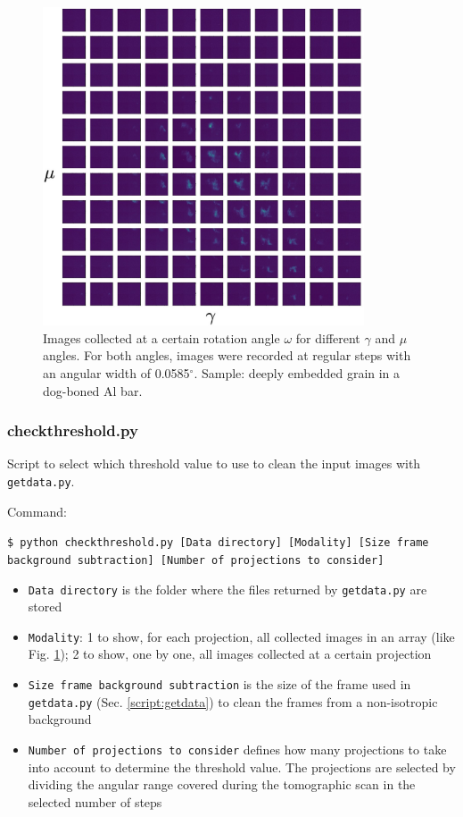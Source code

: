 \documentclass[11pt]{scrartcl}
\begin{document}
\begin{figure}[h!]
    \centering
    \includegraphics[width=0.85\textwidth]{Img_one_proj}
    \caption{Images collected at a certain rotation angle $\omega$ for different $\gamma$ and $\mu$ angles. For both angles, images were recorded at regular steps with an angular width of 0.0585$^{\circ}$. Sample: deeply embedded grain in a dog-boned Al bar.}
    \label{fig:all_pics_one_om}
\end{figure}

\subsubsection{check\textunderscore threshold.py}

Script to select which threshold value to use to clean the input images with {\texttt{getdata.py}}.

Command:

{\texttt{\$ python check\textunderscore threshold.py [Data directory] [Modality] [Size frame background subtraction] [Number of projections to consider]}}

\begin{itemize}
    \item {\texttt{Data directory}} is the folder where the files returned by {\texttt{getdata.py}} are stored
    \item {\texttt{Modality}}: 1 to show, for each projection, all collected images in an array (like Fig. \ref{fig:all_pics_one_om}); 2 to show, one by one, all images collected at a certain projection
    \item {\texttt{Size frame background subtraction}} is the size of the frame used in {\texttt{getdata.py}} (Sec. \ref{script:getdata}) to clean the frames from a non-isotropic background
    \item {\texttt{Number of projections to consider}} defines how many projections to take into account to determine the threshold value. The projections are selected by dividing the angular range covered during the tomographic scan in the selected number of steps
\end{itemize}
\end{document}

